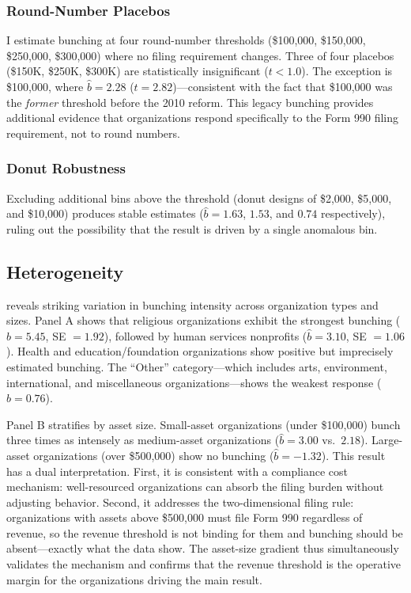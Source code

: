 \documentclass[12pt]{article}
\begin{document}


\subsubsection*{Round-Number Placebos} I estimate bunching at four round-number thresholds (\$100,000, \$150,000, \$250,000, \$300,000) where no filing requirement changes. Three of four placebos (\$150K, \$250K, \$300K) are statistically insignificant ($t < 1.0$). The exception is \$100,000, where $\hat{b} = 2.28$ ($t = 2.82$)---consistent with the fact that \$100,000 was the \textit{former} threshold before the 2010 reform. This legacy bunching provides additional evidence that organizations respond specifically to the Form 990 filing requirement, not to round numbers.

\subsubsection*{Donut Robustness} Excluding additional bins above the threshold (donut designs of \$2,000, \$5,000, and \$10,000) produces stable estimates ($\hat{b} = 1.63$, $1.53$, and $0.74$ respectively), ruling out the possibility that the result is driven by a single anomalous bin.

\subsection{Heterogeneity}

 reveals striking variation in bunching intensity across organization types and sizes. Panel A shows that religious organizations exhibit the strongest bunching ($\hat{b} = 5.45$, SE $= 1.92$), followed by human services nonprofits ($\hat{b} = 3.10$, SE $= 1.06$). Health and education/foundation organizations show positive but imprecisely estimated bunching. The ``Other'' category---which includes arts, environment, international, and miscellaneous organizations---shows the weakest response ($\hat{b} = 0.76$).



Panel B stratifies by asset size. Small-asset organizations (under \$100,000) bunch three times as intensely as medium-asset organizations ($\hat{b} = 3.00$ vs.\ $2.18$). Large-asset organizations (over \$500,000) show no bunching ($\hat{b} = -1.32$). This result has a dual interpretation. First, it is consistent with a compliance cost mechanism: well-resourced organizations can absorb the filing burden without adjusting behavior. Second, it addresses the two-dimensional filing rule: organizations with assets above \$500,000 must file Form 990 regardless of revenue, so the revenue threshold is not binding for them and bunching should be absent---exactly what the data show. The asset-size gradient thus simultaneously validates the mechanism and confirms that the revenue threshold is the operative margin for the organizations driving the main result.
\end{document}
